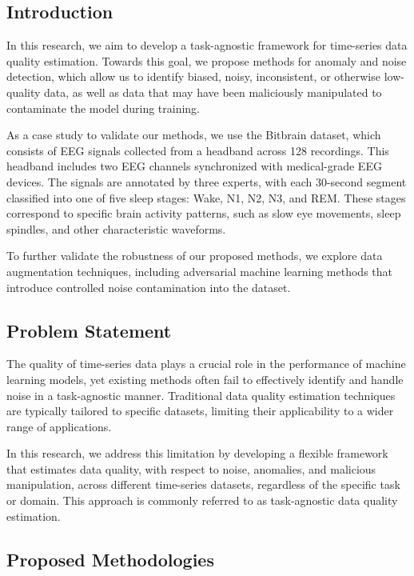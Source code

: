 
\subsection{Introduction}

In this research, we aim to develop a task-agnostic framework for time-series data quality estimation. Towards this goal, we propose methods for anomaly and noise detection, which allow us to identify biased, noisy, inconsistent, or otherwise low-quality data, as well as data that may have been maliciously manipulated to contaminate the model during training.

As a case study to validate our methods, we use the Bitbrain dataset, which consists of EEG signals collected from a headband across 128 recordings. This headband includes two EEG channels synchronized with medical-grade EEG devices. The signals are annotated by three experts, with each 30-second segment classified into one of five sleep stages: Wake, N1, N2, N3, and REM. These stages correspond to specific brain activity patterns, such as slow eye movements, sleep spindles, and other characteristic waveforms.

To further validate the robustness of our proposed methods, we explore data augmentation techniques, including adversarial machine learning methods that introduce controlled noise contamination into the dataset.

\subsection{Problem Statement}

The quality of time-series data plays a crucial role in the performance of machine learning models, yet existing methods often fail to effectively identify and handle noise in a task-agnostic manner. Traditional data quality estimation techniques are typically tailored to specific datasets, limiting their applicability to a wider range of applications. 

In this research, we address this limitation by developing a flexible framework that estimates data quality, with respect to noise, anomalies, and malicious manipulation, across different time-series datasets, regardless of the specific task or domain. This approach is commonly referred to as task-agnostic data quality estimation.

\subsection{Proposed Methodologies}

